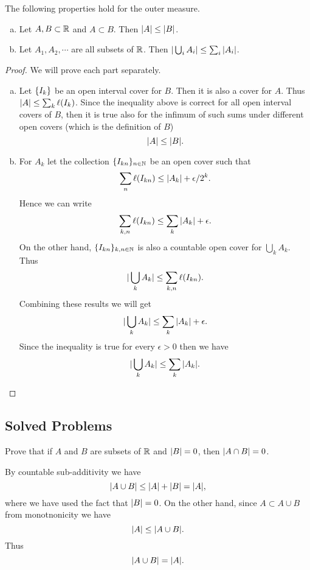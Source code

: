 \begin{proposition}
	The following properties hold for the outer measure.
	\begin{enumerate}[(a)]
		\item Let $ A,B \subset \mathbb{R} $ and $ A \subset B $. Then $ |A| \leq |B| $.
		\item Let $ A_1,A_2,\cdots $ are all subsets of $ \mathbb{R} $. Then $ |\bigcup_i A_i| \leq \sum_i |A_i| $.
	\end{enumerate}
\end{proposition}
\begin{proof}
	We will prove each part separately.
	\begin{enumerate}[(a)]
		\item Let $ \{I_k\} $ be an open interval cover for $ B $. Then it is also a cover for $ A $. Thus 
		$ |A| \leq \sum_k \ell(I_k) $. 
		Since the inequality above is correct for all open interval covers of $ B $, then it is true also for the infimum of such sums under different open covers (which is the definition of $ B $)
		\[ |A| \leq |B|. \]
		
		\item For $ A_k $ let the collection $ \{I_{kn}\}_{n\in\mathbb{N}} $ be an open cover such that
		\[  \sum_n \ell(I_{kn}) \leq |A_k| + \epsilon/2^k. \]
		Hence we can write
		\[ \sum_{k,n} \ell(I_{kn}) \leq \sum_k |A_k| + \epsilon. \]
		On the other hand, $ \{I_{kn}\}_{k,n\in\mathbb{N}} $ is also a countable open cover for $ \bigcup_k A_k $. Thus
		\[ |\bigcup_k A_k| \leq \sum_{k,n} \ell(I_{kn}).   \]
		Combining these results we will get
		\[ |\bigcup_k A_k| \leq \sum_{k}|A_k| + \epsilon. \]
		Since the inequality is true for every $ \epsilon>0 $ then we have
		\[ |\bigcup_k A_k| \leq \sum_{k}|A_k|. \]
	\end{enumerate}
\end{proof}
 
\subsection{Solved Problems}


\begin{problem}
	Prove that if $ A $ and $ B $ are subsets of $ \mathbb{R} $ and $ |B| = 0 $, then $ |A \cap B| = 0 $.
\end{problem}
\begin{solution}
	By countable sub-additivity we have
	\[ |A \cup B| \leq |A| + |B| = |A|, \]
	where we have used the fact that $ |B| = 0 $. On the other hand, since $ A \subset A \cup B $ from monotnonicity we have
	\[ |A| \leq |A \cup B|. \]
	Thus 
	\[ |A \cup B| = |A|. \]
\end{solution}

